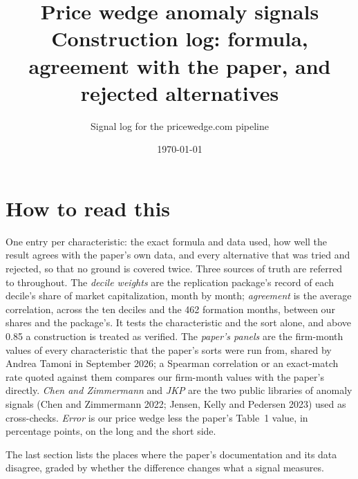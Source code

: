 \documentclass[11pt]{article}
\title{Price wedge anomaly signals\\[2pt]\large Construction log: formula, agreement with the paper, and rejected alternatives}
\author{Signal log for the pricewedge.com pipeline}\date{\today}
\begin{document}
\maketitle

\section*{How to read this}

One entry per characteristic: the exact formula and data used, how well the
result agrees with the paper's own data, and every alternative that was
tried and rejected, so that no ground is covered twice. Three sources of
truth are referred to throughout. The \emph{decile weights} are the
replication package's record of each decile's share of market
capitalization, month by month; \emph{agreement} is the average correlation,
across the ten deciles and the 462 formation months, between our shares and
the package's. It tests the characteristic and the sort alone, and above
0.85 a construction is treated as verified. The \emph{paper's panels} are
the firm-month values of every characteristic that the paper's sorts were
run from, shared by Andrea Tamoni in September 2026; a Spearman correlation
or an exact-match rate quoted against them compares our firm-month values
with the paper's directly. \emph{Chen and Zimmermann} and \emph{JKP} are the
two public libraries of anomaly signals (Chen and Zimmermann 2022; Jensen,
Kelly and Pedersen 2023) used as cross-checks. \emph{Error} is our price
wedge less the paper's Table~1 value, in percentage points, on the long and
the short side.

The last section lists the places where the paper's documentation and its
data disagree, graded by whether the difference changes what a signal
measures.
\end{document}
